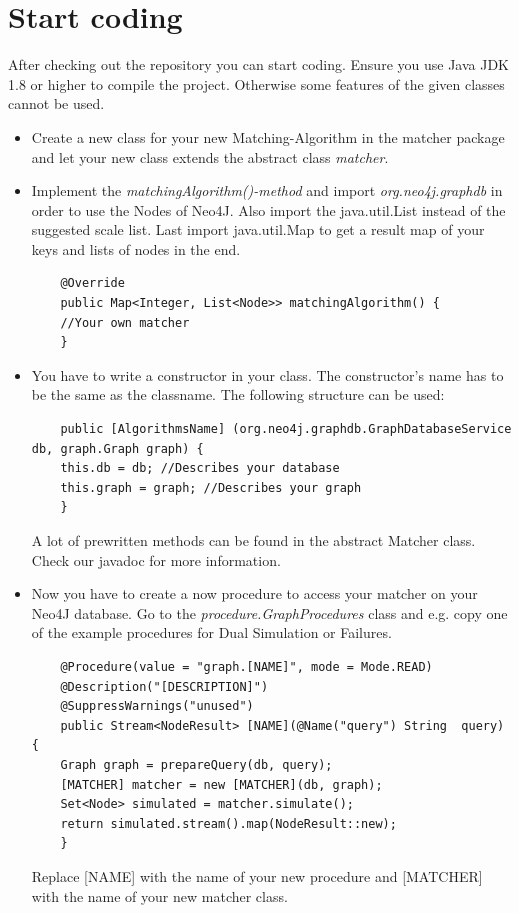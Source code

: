 \section{Start coding}\label{sec:startProgrammingNew}
After checking out the repository you can start coding. Ensure you use Java JDK 1.8 or higher to compile the project. Otherwise some features of the given classes cannot be used.
\begin{itemize}
	\item Create a new class for your new Matching-Algorithm in the matcher package and let your new class extends the abstract class \textit{matcher}.
	\item Implement the \textit{matchingAlgorithm()-method} and import \textit{org.neo4j.graphdb} in order to use the Nodes of Neo4J. Also import the java.util.List instead of the suggested scale list. Last import java.util.Map to get a result map of your keys and lists of nodes in the end.
	\lstset{language=Java}
	\begin{lstlisting} 
	@Override
	public Map<Integer, List<Node>> matchingAlgorithm() {
	//Your own matcher
	}
	\end{lstlisting} 
	
	\item You have to write a constructor in your class. The constructor's name has to be the same as the classname. The following structure can be used: 
	\lstset{language=Java}
	\begin{lstlisting}
	public [AlgorithmsName] (org.neo4j.graphdb.GraphDatabaseService db, graph.Graph graph) {
	this.db = db; //Describes your database
	this.graph = graph; //Describes your graph
	}
	\end{lstlisting}
	A lot of prewritten methods can be found in the abstract \glqq Matcher\grqq{} class. Check our javadoc for more information.
	\item Now you have to create a now procedure to access your matcher on your Neo4J database. Go to the \textit{procedure.GraphProcedures} class and e.g. copy one of the example procedures for Dual Simulation or Failures.
	\begin{lstlisting}
	@Procedure(value = "graph.[NAME]", mode = Mode.READ)
	@Description("[DESCRIPTION]")
	@SuppressWarnings("unused")
	public Stream<NodeResult> [NAME](@Name("query") String 	query) {
	Graph graph = prepareQuery(db, query);
	[MATCHER] matcher = new [MATCHER](db, graph);
	Set<Node> simulated = matcher.simulate();
	return simulated.stream().map(NodeResult::new);
	}
	\end{lstlisting} 
	Replace [NAME] with the name of your new procedure and [MATCHER] with the name of your new matcher class.
\end{itemize}

